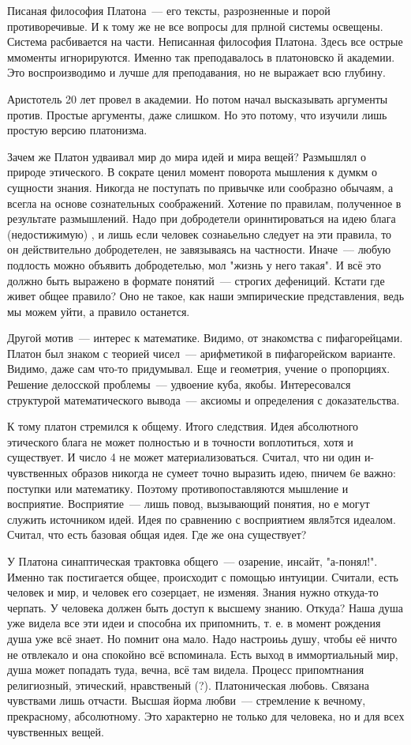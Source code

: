 Писаная философия Платона~--- его тексты, разрозненные и порой противоречивые. И к тому же не все вопросы для прлной системы освещены. Система расбивается на части. 
Неписанная философия Платона. Здесь все острые ммоменты игнорируются. Именно так преподавалось в платоновско й академии. Это воспроизводимо и лучше для преподавания, но не выражает всю глубину. 

Аристотель 20 лет провел в академии. Но потом начал высказывать аргументы против. Простые аргументы, даже слишком. Но это потому, что изучили лишь простую версию платонизма. 

Зачем же Платон удваивал мир до мира идей и мира вещей?
Размышлял о природе этического. В сократе ценил момент поворота мышления к думкм о сущности знания. Никогда не поступать по привычке или сообразно обычаям, а всегла на основе сознательных соображений. 
Хотение по правилам, полученное в результате размышлений. Надо при добродетели ориннтироваться на идею блага (недостижимую) , и лишь если человек сознаьельно следует на эти правила, то он действительно добродетелен, не завязываясь на частности. 
Иначе~--- любую подлость можно объявить добродетелью, мол "жизнь у него такая". 
И всё это должно быть выражено в формате понятий~--- строгих дефениций. Кстати где живет общее правило? Оно не такое, как наши эмпирические представления, ведь мы можем уйти, а правило останется. 

Другой мотив~--- интерес к математике. Видимо, от знакомства с пифагорейцами. 
Платон был знаком с теорией чисел~--- арифметикой в пифагорейском варианте. Видимо, даже сам что-то придумывал. Еще и геометрия, учение о пропорциях. 
Решение делосской проблемы~--- удвоение куба, якобы. Интересовался структурой математического вывода~--- аксиомы и определения с доказательства. 

К тому платон стремился к общему. Итого следствия. 
Идея абсолютного этического блага не может полностью и в точности воплотиться, хотя и существует. И число 4 не может материализоваться. Считал, что ни один и- чувственных образов никогда не сумеет точно выразить идею, пничем 6е важно: поступки или математику. Поэтому противопоставляются мышление и восприятие. 
Восприятие~--- лишь повод, вызывающий понятия, но е могут служить источником идей. Идея по сравнению с восприятием явля5тся идеалом. Считал, что есть базовая общая идея. Где же она существует?

У Платона синаптическая трактовка общего~--- озарение, инсайт, "а-понял!". Именно так постигается общее, происходит с помощью интуиции. Считали, есть человек и мир, и человек его созерцает, не изменяя. 
Знания нужно откуда-то черпать. У человека должен быть доступ к высшему знанию. Откуда? Наша душа уже видела все эти идеи и способна их припомнить, т. е. в момент рождения душа уже всё знает. 
Но помнит она мало. Надо настроиьь душу, чтобы её ничто не отвлекало и она спокойно всё вспоминала. 
Есть выход в иммортиальный мир, душа может попадать туда, вечна, всё там видела. Процесс припомтнания религиозный, этический, нравственый (?). Платоническая любовь. Связана чувствами лишь отчасти. Высшая йорма любви~--- стремление к вечному, прекрасному, абсолютному. Это характерно не только для человека, но и для всех чувственных вещей. 

